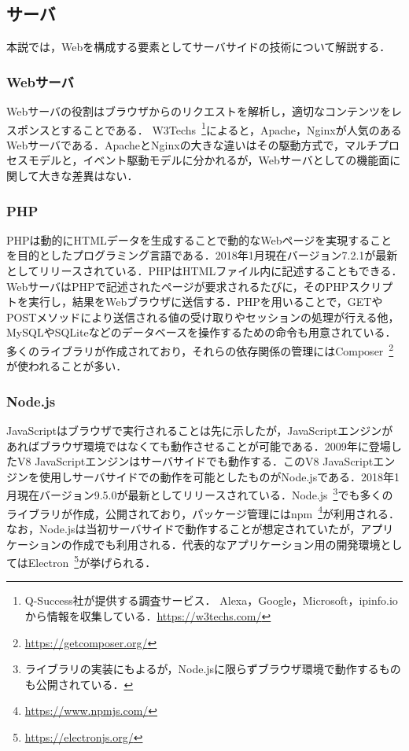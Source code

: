 \subsection{サーバ}
本説では，Webを構成する要素としてサーバサイドの技術について解説する．
\subsubsection{Webサーバ}
Webサーバの役割はブラウザからのリクエストを解析し，適切なコンテンツをレスポンスとすることである．
W3Techs~\footnote{Q-Success社が提供する調査サービス． Alexa，Google，Microsoft，ipinfo.ioから情報を収集している．\url{https://w3techs.com/}}によると，Apache，Nginxが人気のあるWebサーバである．ApacheとNginxの大きな違いはその駆動方式で，マルチプロセスモデルと，イベント駆動モデルに分かれるが，Webサーバとしての機能面に関して大きな差異はない．
\subsubsection{PHP}
PHPは動的にHTMLデータを生成することで動的なWebページを実現することを目的としたプログラミング言語である．2018年1月現在バージョン7.2.1が最新としてリリースされている．PHPはHTMLファイル内に記述することもできる．WebサーバはPHPで記述されたページが要求されるたびに，そのPHPスクリプトを実行し，結果をWebブラウザに送信する．PHPを用いることで，GETやPOSTメソッドにより送信される値の受け取りやセッションの処理が行える他，MySQLやSQLiteなどのデータベースを操作するための命令も用意されている．多くのライブラリが作成されており，それらの依存関係の管理にはComposer~\footnote{\url{https://getcomposer.org/}}が使われることが多い．
\subsubsection{Node.js}
JavaScriptはブラウザで実行されることは先に示したが，JavaScriptエンジンがあればブラウザ環境ではなくても動作させることが可能である．2009年に登場したV8 JavaScriptエンジンはサーバサイドでも動作する．このV8 JavaScriptエンジンを使用しサーバサイドでの動作を可能としたものがNode.jsである．2018年1月現在バージョン9.5.0が最新としてリリースされている．Node.js~\footnote{ライブラリの実装にもよるが，Node.jsに限らずブラウザ環境で動作するものも公開されている．}でも多くのライブラリが作成，公開されており，パッケージ管理にはnpm~\footnote{\url{https://www.npmjs.com/}}が利用される．なお，Node.jsは当初サーバサイドで動作することが想定されていたが，アプリケーションの作成でも利用される．代表的なアプリケーション用の開発環境としてはElectron~\footnote{\url{https://electronjs.org/}}が挙げられる．
